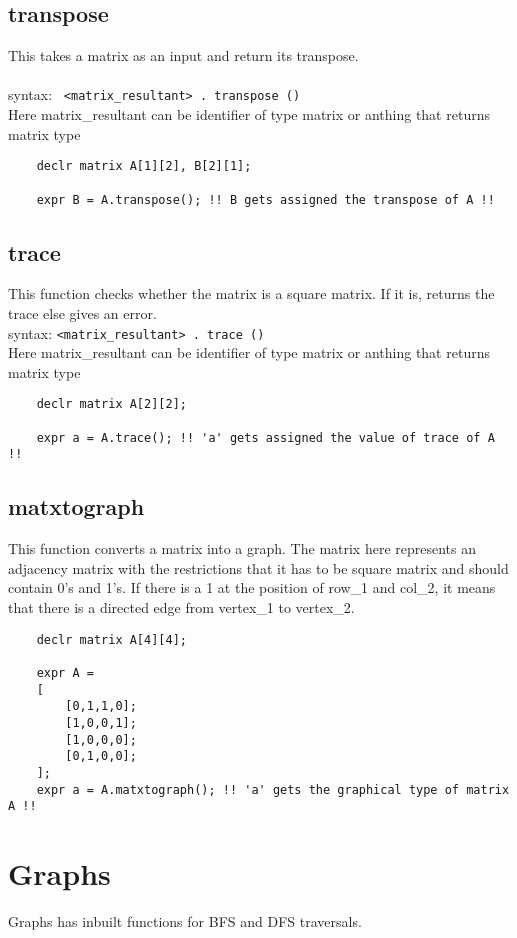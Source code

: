 \documentclass[journal, 18pt]{report}
\begin{document}
\subsection{transpose}
This takes a matrix as an input and return its transpose.\\\\
syntax: \texttt{ <matrix\_resultant> . transpose () }\\
Here matrix\_resultant can be identifier of type matrix or anthing that returns matrix type
\begin{lstlisting}
    declr matrix A[1][2], B[2][1];

    expr B = A.transpose(); !! B gets assigned the transpose of A !!
\end{lstlisting}
\subsection{trace}
This function checks whether the matrix is a square matrix. If it is, returns the trace else gives an error.\\
syntax: \texttt{<matrix\_resultant> . trace () }\\
Here matrix\_resultant can be identifier of type matrix or anthing that returns matrix type
\begin{lstlisting}
    declr matrix A[2][2]; 

    expr a = A.trace(); !! 'a' gets assigned the value of trace of A !!
\end{lstlisting}
\subsection{matxtograph}
This function converts a matrix into a graph. The matrix here represents an adjacency matrix with the restrictions that it has to be square matrix and should contain 0's and 1's. If there is a 1 at the position of row\_1 and col\_2, it means that there is a directed edge from vertex\_1 to vertex\_2.\\
\begin{lstlisting}
    declr matrix A[4][4]; 

    expr A = 
    [
        [0,1,1,0];
        [1,0,0,1];
        [1,0,0,0];
        [0,1,0,0];
    ];
    expr a = A.matxtograph(); !! 'a' gets the graphical type of matrix A !!
\end{lstlisting}
\section{Graphs}
Graphs has inbuilt functions for BFS and DFS traversals.
\end{document}
